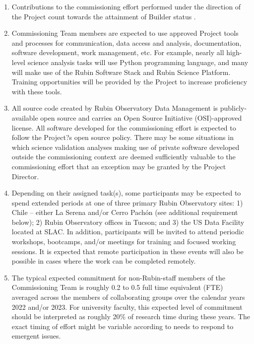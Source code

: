 \documentclass[SE,authoryear,toc,lsstdraft]{lsstdoc}
\begin{document}
\begin{enumerate}
\item Contributions to the commissioning effort performed under the direction of the Project count towards the attainment of Builder status .

\item Commissioning Team members are expected to use approved Project tools and processes for communication, data access and analysis, documentation, software development, work management, etc. For example, nearly all high-level science analysis tasks will use Python programming language, and many will make use of the Rubin Software Stack and Rubin Science Platform. Training opportunities will be provided by the Project to increase proficiency with these tools. 

\item All source code created by Rubin Observatory Data Management is publicly-available open source and carries an Open Source Initiative (OSI)-approved license. All software developed for the commissioning effort is expected to follow the Project?s open source policy. There may be some situations in which science validation analyses making use of private software developed outside the commissioning context are deemed sufficiently valuable to the commissioning effort that an exception may be granted by the Project Director. 

\item Depending on their assigned task(s), some participants may be expected to spend extended periods at one of three primary Rubin Observatory sites: 1) Chile -- either La Serena and/or Cerro Pach\'{o}n (see additional requirement below); 2) Rubin Observatory offices in Tucson; and 3) the US Data Facility located at SLAC. In addition, participants will be invited to attend periodic workshops, bootcamps, and/or meetings for training and focused working sessions. It is expected that remote participation in these events will also be possible in cases where the work can be completed remotely.


\item The typical expected commitment for non-Rubin-staff members of the Commissioning Team is roughly 0.2 to 0.5 full time equivalent (FTE) averaged across the members of collaborating groups over the calendar years 2022 and/or 2023. For university faculty, this expected level of commitment should be interpreted as roughly 20\% of research time during these years. The exact timing of effort might be variable according to needs to respond to emergent issues. 


\end{enumerate}
\end{document}
